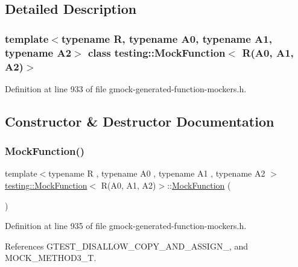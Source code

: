 \subsection{Detailed Description}
\subsubsection*{template$<$typename R, typename A0, typename A1, typename A2$>$\newline
class testing\+::\+Mock\+Function$<$ R(\+A0, A1, A2)$>$}



Definition at line 933 of file gmock-\/generated-\/function-\/mockers.\+h.



\subsection{Constructor \& Destructor Documentation}
\mbox{\label{classtesting_1_1MockFunction_3_01R_07A0_00_01A1_00_01A2_08_4_a33e409a6528b41103fe36844e4bb2bfe}} 
\subsubsection{\texorpdfstring{Mock\+Function()}{MockFunction()}}
{\footnotesize\ttfamily template$<$typename R , typename A0 , typename A1 , typename A2 $>$ \\
\hyperlink{classtesting_1_1MockFunction}{testing\+::\+Mock\+Function}$<$ R(A0, A1, A2)$>$\+::\hyperlink{classtesting_1_1MockFunction}{Mock\+Function} (\begin{DoxyParamCaption}{ }\end{DoxyParamCaption})\hspace{0.3cm}{\ttfamily [inline]}}



Definition at line 935 of file gmock-\/generated-\/function-\/mockers.\+h.



References G\+T\+E\+S\+T\+\_\+\+D\+I\+S\+A\+L\+L\+O\+W\+\_\+\+C\+O\+P\+Y\+\_\+\+A\+N\+D\+\_\+\+A\+S\+S\+I\+G\+N\+\_\+, and M\+O\+C\+K\+\_\+\+M\+E\+T\+H\+O\+D3\+\_\+T.


